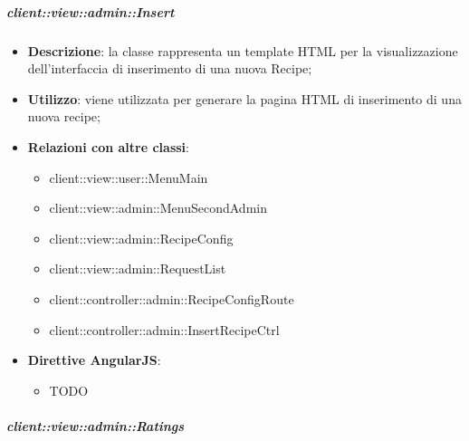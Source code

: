 		\subparagraph{client::view::admin::Insert} %
		\label{subp:bdsm_app_client_view_admin_insert}

			\begin{itemize}
				\item \textbf{Descrizione}: la classe rappresenta un template HTML per la visualizzazione dell'interfaccia di inserimento di una nuova Recipe;
				\item \textbf{Utilizzo}: viene utilizzata per generare la pagina HTML di inserimento di una nuova recipe;
				\item \textbf{Relazioni con altre classi}:
					\begin{itemize}
						\item client::view::user::MenuMain
						\item client::view::admin::MenuSecondAdmin
						\item client::view::admin::RecipeConfig
						\item client::view::admin::RequestList
						\item client::controller::admin::RecipeConfigRoute
						\item client::controller::admin::InsertRecipeCtrl
					\end{itemize}
				\item \textbf{Direttive AngularJS}:
					\begin{itemize}
						\item TODO
					\end{itemize}
			\end{itemize}

		\subparagraph{client::view::admin::Ratings} %
		\label{subp:bdsm_app_client_view_admin_ratings}

